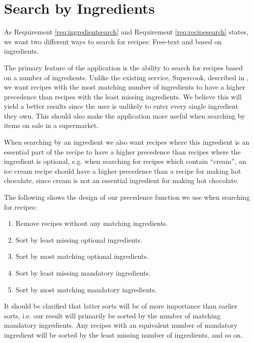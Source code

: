 \section{Search by Ingredients}\label{sec:design_search}
As Requirement \ref{req:ingredientsearch} and Requirement \ref{req:recipesearch} states, we want two different ways to search for recipes: Free-text and based on ingredients.

The primary feature of the application is the ability to search for recipes based on a number of ingredients. Unlike the existing service, Supercook, described in , we want recipes with the most matching number of ingredients to have a higher precedence than recipes with the least missing ingredients. We believe this will yield a better results since the user is unlikely to enter every single ingredient they own. This should also make the application more useful when searching by items on sale in a supermarket.

When searching by an ingredient we also want recipes where this ingredient is an essential part of the recipe to have a higher precedence than recipes where the ingredient is optional, e.g. when searching for recipes which contain ``cream'', an ice cream recipe should have a higher precedence than a recipe for making hot chocolate, since cream is not an essential ingredient for making hot chocolate.

 The following shows the design of our precedence function we use when searching for recipes:
\begin{enumerate}
	\item Remove recipes without any matching ingredients.
	\item Sort by least missing optional ingredients.
	\item Sort by most matching optional ingredients.
	\item Sort by least missing mandatory ingredients.
	\item Sort by most matching mandatory ingredients.
\end{enumerate}
It should be clarified that latter sorts will be of more importance than earlier sorts, i.e. our result will primarily be sorted by the number of matching mandatory ingredients. Any recipes with an equivalent number of mandatory ingredient will be sorted by the least missing number of ingredients, and so on.